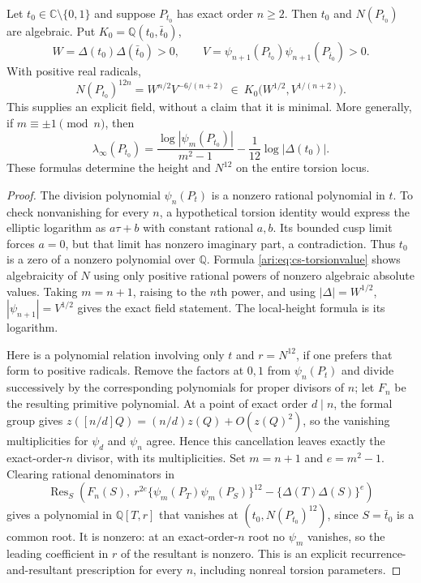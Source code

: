 \begin{proposition}\label{ari:C.4.3}
Let $t_0\in\mathbb C\setminus\{0,1\}$ and suppose $P_{t_0}$ has
exact order $n\ge2$. Then $t_0$ and $N(P_{t_0})$ are algebraic.
Put $K_0=\mathbb Q(t_0,\bar t_0)$,
\[
 W=\Delta(t_0)\Delta(\bar t_0)>0,\qquad
 V=\psi_{n+1}(P_{t_0})\psi_{n+1}(P_{\bar t_0})>0.
\]
With positive real radicals,
\[
 N(P_{t_0})^{12n}=W^{n/2}V^{-6/(n+2)}
 \ \in\ K_0\bigl(W^{1/2},V^{1/(n+2)}\bigr).
\]
This supplies an explicit field, without a claim that it is minimal.
More generally, if $m\equiv\pm1\pmod n$, then
\[
 \lambda_\infty(P_{t_0})
 =\frac{\log|\psi_m(P_{t_0})|}{m^2-1}
       -\frac1{12}\log|\Delta(t_0)|.
\]
These formulas determine the height and $N^{12}$ on the entire
torsion locus.
\end{proposition}
\begin{proof}
The division polynomial $\psi_n(P_t)$ is a nonzero rational
polynomial in $t$. To check nonvanishing for every $n$, a hypothetical
torsion identity would express the elliptic logarithm as
$a\tau+b$ with constant rational $a,b$. Its bounded cusp limit
forces $a=0$, but that limit has nonzero imaginary part, a
contradiction. Thus $t_0$ is a zero of a nonzero polynomial over
$\mathbb Q$. Formula \eqref{ari:eq:cs-torsionvalue} shows algebraicity
of $N$ using only positive rational powers of nonzero algebraic
absolute values. Taking $m=n+1$, raising to the $n$th power, and
using $|\Delta|=W^{1/2}$, $|\psi_{n+1}|=V^{1/2}$ gives the exact
field statement. The local-height formula is its logarithm.

Here is a polynomial relation involving only $t$ and $r=N^{12}$,
if one prefers that form to positive radicals. Remove the factors
at $0,1$ from $\psi_n(P_t)$ and divide successively by the
corresponding polynomials for proper divisors of $n$; let $F_n$ be
the resulting primitive polynomial. At a point of exact order
$d\mid n$, the formal group gives
$z([n/d]Q)=(n/d)z(Q)+O(z(Q)^2)$, so the vanishing multiplicities for
$\psi_d$ and $\psi_n$ agree. Hence this cancellation leaves exactly
the exact-order-$n$ divisor, with its multiplicities. Set
$m=n+1$ and $e=m^2-1$. Clearing rational denominators in
\[
 \operatorname{Res}_S\left(
 F_n(S),\
 r^{2e}\{\psi_m(P_T)\psi_m(P_S)\}^{12}
              -\{\Delta(T)\Delta(S)\}^{e}\right)
\]
gives a polynomial in $\mathbb Q[T,r]$ that vanishes at
$(t_0,N(P_{t_0})^{12})$, since $S=\bar t_0$ is a common root.
It is nonzero: at an exact-order-$n$ root no $\psi_m$ vanishes,
so the leading coefficient in $r$ of the resultant is nonzero.
This is an explicit recurrence-and-resultant prescription for
every $n$, including nonreal torsion parameters.
\end{proof}

